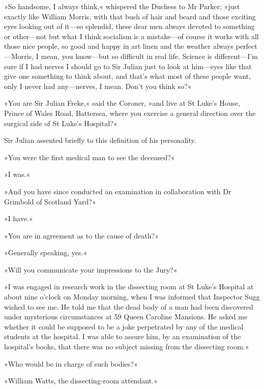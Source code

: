 »So handsome, I always think,« whispered the Duchess to Mr Parker; »just exactly like William Morris, with that bush of hair and beard and those exciting eyes looking out of it\allowbreak---\allowbreak so splendid, these dear men always devoted to something or other\allowbreak---\allowbreak not but what I think socialism is a mistake\allowbreak---\allowbreak of course it works with all those nice people, so good and happy in art linen and the weather always perfect\allowbreak---\allowbreak Morris, I mean, you know\allowbreak---\allowbreak but so difficult in real life. Science is different\allowbreak---\allowbreak I'm sure if I had nerves I should go to Sir Julian just to look at him\allowbreak---\allowbreak eyes like that give one something to think about, and that's what most of these people want, only I never had any\allowbreak---\allowbreak nerves, I mean. Don't you think so?«

»You are Sir Julian Freke,« said the Coroner, »and live at St Luke's House, Prince of Wales Road, Battersea, where you exercise a general direction over the surgical side of St Luke's Hospital?«

Sir Julian assented briefly to this definition of his personality.

»You were the first medical man to see the deceased?«

»I was.«

»And you have since conducted an examination in collaboration with Dr Grimbold of Scotland Yard?«

»I have.«

»You are in agreement as to the cause of death?«

»Generally speaking, yes.«

»Will you communicate your impressions to the Jury?«

»I was engaged in research work in the dissecting room at St Luke's Hospital at about nine o'clock on Monday morning, when I was informed that Inspector Sugg wished to see me. He told me that the dead body of a man had been discovered under mysterious circumstances at 59 Queen Caroline Mansions. He asked me whether it could be supposed to be a joke perpetrated by any of the medical students at the hospital. I was able to assure him, by an examination of the hospital's books, that there was no subject missing from the dissecting room.«

»Who would be in charge of such bodies?«

»William Watts, the dissecting-room attendant.«

